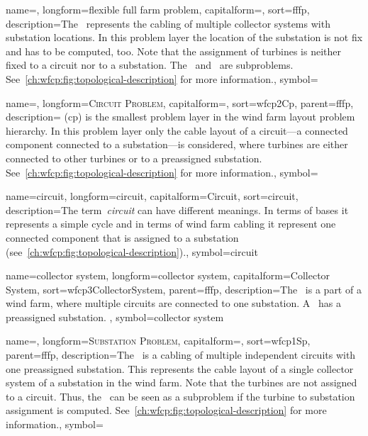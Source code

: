 
{
    name={\wfffp},
    longform={flexible full farm problem},
    capitalform={\WfFFP},
    sort={fffp},
    description={The~ represents the cabling of multiple
    collector systems with substation locations. In this problem layer the
    location of the substation is not fix and has to be computed, too. Note that
    the assignment of turbines is neither fixed to a circuit nor to a
    substation. The~ and~ are subproblems.
    See~\cref{ch:wfcp:fig:topological-description} for more information.},
    symbol={\wfffp}
}

{
    name={\wcp},
    longform={\textsc{Circuit Problem}\xspace},
    capitalform={\WCP},
    sort={wfcp2Cp},
    parent={fffp},
    description={ (\gls{cp}) is the smallest problem layer in
    the wind farm layout problem hierarchy. In this problem layer only the cable
    layout of a circuit---a connected component connected to a substation---is
    considered, where turbines are either connected to other turbines or to a
    preassigned substation. See~\cref{ch:wfcp:fig:topological-description} for
    more information.}, symbol={\wcp} }

{
    name={circuit},
    longform={circuit},
    capitalform={Circuit},
    sort={circuit},
    description={The term~\emph{circuit} can have different meanings. In terms
    of bases it represents a simple cycle and in terms of wind farm cabling it
    represent one connected component that is assigned to a substation 
    (see~\cref{ch:wfcp:fig:topological-description}).},
    symbol={circuit} }

{
    name={collector system},
    longform={collector system},
    capitalform={Collector System},
    sort={wfcp3CollectorSystem},
    parent={fffp},
    description={The~ is a part of a wind farm,
    where multiple circuits are connected to one substation.
    A~ has a preassigned substation. }, 
    symbol={collector system} 
}

{
    name={\wsp},
    longform={\textsc{Substation Problem}\xspace},
    capitalform={\WSP},
    sort={wfcp1Sp},
    parent={fffp},
    description={The~ is a cabling of multiple independent
    circuits with one preassigned substation. This represents the cable layout
    of a single collector system of a substation in the wind farm. Note that the
    turbines are not assigned to a circuit. Thus, the~ can be
    seen as a subproblem if the turbine to substation assignment is computed. 
    See~\cref{ch:wfcp:fig:topological-description} for more information.},
    symbol={\wsp}
}


